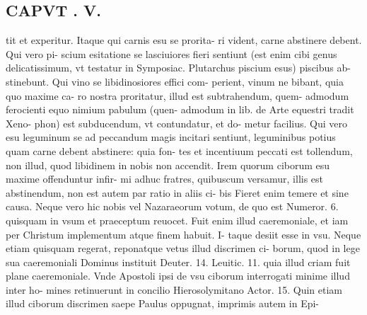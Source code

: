 \documentclass{article}
\begin{document}
\begin{pages}
\section*{CAPVT . V. }
\marginpar{[ p.277 ]}\pstart tit et experitur. Itaque qui carnis esu se prorita- ri vident, carne abstinere debent. Qui vero pi- scium esitatione se lasciuiores fieri sentiunt (est enim cibi genus delicatissimum, vt testatur in Symposiac. Plutarchus piscium esus) piscibus ab- stinebunt. Qui vino se libidinosiores effici com- perient, vinum ne bibant, quia quo maxime ca- ro nostra proritatur, illud est subtrahendum, quem- admodum ferocienti equo nimium pabulum (quen- admodum in lib.  de Arte equestri tradit Xeno- phon) est subducendum, vt contundatur, et do- metur facilius. Qui vero esu leguminum se ad peccandum magis incitari sentiunt, leguminibus potius quam carne debent abstinere: quia fon- tes et incentiuum peccati est tollendum, non illud, quod libidinem in nobis non accendit. Irem quorum ciborum esu maxime offenduntur infir- mi adhuc fratres, quibuscum versamur, illis est abstinendum, non est autem par ratio in aliis ci- bis Fieret enim temere et sine causa. Neque vero hic nobis vel Nazaraeorum votum, de quo est Numeror. 6. quisquam in vsum et praeceptum reuocet. Fuit enim illud caeremoniale, et iam per Christum implementum atque finem habuit. I- taque desiit esse in vsu. Neque etiam quisquam regerat, reponatque vetus illud discrimen ci- borum, quod in lege sua caeremoniali Dominus instituit Deuter. 14. Leuitic. 11. quia illud criam fuit plane caeremoniale. Vnde Apostoli ipsi de vsu ciborum interrogati minime illud inter ho- mines retinuerunt in concilio Hierosolymitano Actor. 15. Quin etiam illud ciborum discrimen saepe Paulus oppugnat, imprimis autem in Epi-  \pend

\end{pages}
\end{document}
